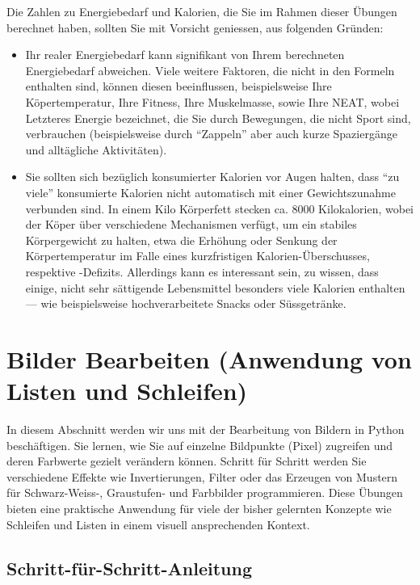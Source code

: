 \begin{mycaution}
	Die Zahlen zu Energiebedarf und Kalorien, die Sie im Rahmen dieser Übungen berechnet haben, sollten Sie mit Vorsicht geniessen, aus folgenden Gründen:
	\begin{itemize}
		\item Ihr realer Energiebedarf kann signifikant von Ihrem berechneten Energiebedarf abweichen. Viele weitere Faktoren, die nicht in den Formeln enthalten sind, können diesen beeinflussen, beispielsweise Ihre Köpertemperatur, Ihre Fitness, Ihre Muskelmasse, sowie Ihre \gls{NEAT}, wobei Letzteres Energie bezeichnet, die Sie durch Bewegungen, die nicht Sport sind, verbrauchen (beispielsweise durch \enquote{Zappeln} aber auch kurze Spaziergänge und alltägliche Aktivitäten).
		\item Sie sollten sich bezüglich konsumierter Kalorien vor Augen halten, dass \enquote{zu viele} konsumierte Kalorien nicht automatisch mit einer Gewichtszunahme verbunden sind. In einem Kilo Körperfett stecken ca. 8000 Kilokalorien, wobei der Köper über verschiedene Mechanismen verfügt, um ein stabiles Körpergewicht zu halten, etwa die Erhöhung oder Senkung der Körpertemperatur im Falle eines kurzfristigen Kalorien-Überschusses, respektive -Defizits. Allerdings kann es interessant sein, zu wissen, dass einige, nicht sehr sättigende Lebensmittel besonders viele Kalorien enthalten --- wie beispielsweise hochverarbeitete Snacks oder Süssgetränke.
	\end{itemize}
\end{mycaution}


\clearpage
\section{Bilder Bearbeiten (Anwendung von Listen und Schleifen)}
In diesem Abschnitt werden wir uns mit der Bearbeitung von Bildern in Python beschäftigen.
Sie lernen, wie Sie auf einzelne Bildpunkte (Pixel) zugreifen und deren Farbwerte gezielt verändern können.
Schritt für Schritt werden Sie verschiedene Effekte wie Invertierungen, Filter oder das Erzeugen von Mustern für Schwarz-Weiss-, Graustufen- und Farbbilder programmieren.
Diese Übungen bieten eine praktische Anwendung für viele der bisher gelernten Konzepte wie Schleifen und Listen in einem visuell ansprechenden Kontext.


\subsection{Schritt-für-Schritt-Anleitung}

